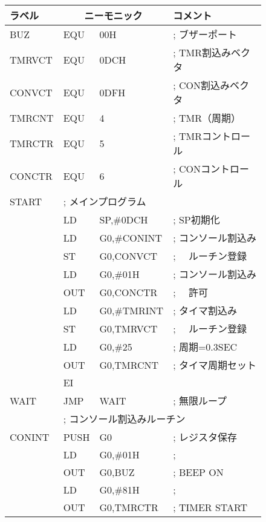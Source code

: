 \begin{figure}[bt]
{\small\tt\begin{center}
\begin{tabular}{|l|l l l|} \hline
ラベル & \multicolumn{2}{|c}{ニーモニック} & コメント\\
\hline
BUZ    & EQU    & 00H               & ; ブザーポート  \\
TMRVCT & EQU    & 0DCH              & ; TMR割込みベクタ  \\
CONVCT & EQU    & 0DFH              & ; CON割込みベクタ  \\
TMRCNT & EQU    & 4                 & ; TMR（周期）  \\
TMRCTR & EQU    & 5                 & ; TMRコントロール  \\
CONCTR & EQU    & 6                 & ; CONコントロール  \\
START  & \multicolumn{3}{|l|}{; メインプログラム}     \\ 
       & LD     & SP,\#0DCH         & ; SP初期化  \\
       & LD     & G0,\#CONINT       & ; コンソール割込み  \\
       & ST     & G0,CONVCT         & ; 　ルーチン登録  \\
       & LD     & G0,\#01H          & ; コンソール割込み  \\
       & OUT    & G0,CONCTR         & ; 　許可  \\
       & LD     & G0,\#TMRINT       & ; タイマ割込み  \\
       & ST     & G0,TMRVCT         & ; 　ルーチン登録  \\
       & LD     & G0,\#25           & ; 周期=0.3SEC  \\
       & OUT    & G0,TMRCNT         & ; タイマ周期セット  \\
       & EI     &                   &   \\
WAIT   & JMP    & WAIT              & ; 無限ループ  \\
       & \multicolumn{3}{|l|}{; コンソール割込みルーチン}       \\
CONINT & PUSH   & G0                & ; レジスタ保存  \\
       & LD     & G0,\#01H          & ;   \\
       & OUT    & G0,BUZ            & ; BEEP ON  \\
       & LD     & G0,\#81H          & ;  \\
       & OUT    & G0,TMRCTR         & ; TIMER START  \\

\end{tabular}
\end{center}}
\end{figure}
